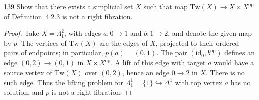 \begin{exercise}{139}
Show that there exists a simplicial set $X$ such that map $\mathrm{Tw}(X)\to X\times X^{\mathrm{op}}$
of Definition~4.2.3 is not a right fibration.

\begin{proof}
Take $X=\Lambda^2_1$, with edges $a\colon0\to1$ and $b\colon1\to2$,
and denote the given map by $p$.
The vertices of $\mathrm{Tw}(X)$ are the edges of $X$, projected to
their ordered pairs of endpoints; in particular, $p(a)=(0,1)$.
The pair $(\mathrm{id}_0,b^{\mathrm{op}})$ defines an edge
$(0,2)\to(0,1)$ in $X\times X^{\mathrm{op}}$.
A lift of this edge with target $a$ would have a source vertex of
$\mathrm{Tw}(X)$ over $(0,2)$, hence an edge $0\to2$ in $X$.
There is no such edge.
Thus the lifting problem for $\Lambda^1_1=\{1\}\hookrightarrow\Delta^1$
with top vertex $a$ has no solution, and $p$ is not a right fibration.
\end{proof}
\end{exercise}
